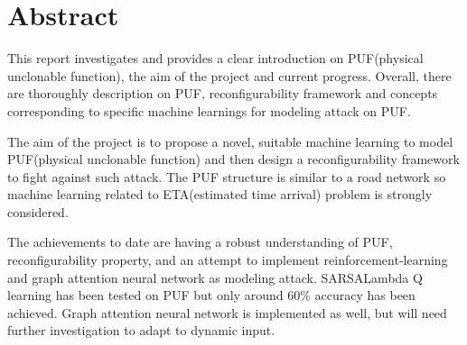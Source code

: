 \chapter*{\Large \center Abstract}
\setlength{\parskip}{\baselineskip}%
\setlength{\parindent}{0pt}%

This report investigates and provides a clear introduction on PUF(physical unclonable function),
the aim of the project and current progress. Overall, there are thoroughly description on
PUF, reconfigurability framework and concepts corresponding to specific machine learnings
for modeling attack on PUF.

The aim of the project is to propose a novel, suitable machine learning to model PUF(physical
unclonable function) and then design a reconfigurability framework to fight against such
attack. The PUF structure is similar to a road network so machine learning related to
ETA(estimated time arrival) problem is strongly considered.

The achievements to date are having a robust understanding of PUF, reconfigurability property,
and an attempt to implement reinforcement-learning and graph attention neural network as modeling attack. SARSALambda Q
learning has been tested on PUF but only around 60\% accuracy has been achieved. Graph attention neural network
is implemented as well, but will need further investigation to adapt to dynamic input.
